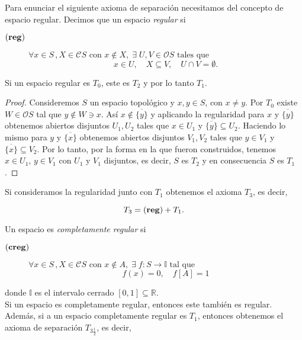 Para enunciar el siguiente axioma de separación necesitamos del concepto de espacio regular. Decimos que un espacio \emph{regular} si

\begin{description}
\item[$(\mbox{\textbf{reg}})$] $\forall x\in S\,, X\in \mathcal{C}S \mbox{ con }x\notin X,\; \exists\; U, V\in \mathcal{O}S \mbox{ tales que }$
\[
x\in U,\quad X\subseteq V, \quad U\cap V=\emptyset.
\]
\end{description}

\begin{prop}
    Si un espacio regular es $T_0$, este es $T_2$ y por lo tanto $T_1$.
\end{prop}

\begin{proof}
    Consideremos $S$ un espacio topológico y $x, y \in S$, con $x\neq y$. Por $T_0$ existe $W\in \mathcal{O}S$ tal que $y\notin W \ni x$. Así $x\notin \overline{\{y\}}$ y aplicando la regularidad para $x$ y $\overline{\{y\}}$ obtenemos abiertos disjuntos $U_1, U_2$ tales que $x\in U_1$ y $\overline{\{y\}}\subseteq U_2$. Haciendo lo mismo para $y$ y $\overline{\{x\}}$ obtenemos abiertos disjuntos $V_1, V_2$ tales que $y\in V_1$ y $\overline{\{x\}}\subseteq V_2$. Por lo tanto, por la forma en la que fueron construidos, tenemos $x\in U_1,\, y\in V_1$ con $U_1$ y $V_1$ disjuntos, es decir, $S$ es $T_2$ y en consecuencia $S$ es $T_1$.
\end{proof}

Si consideramos la regularidad junto con $T_1$ obtenemos el axioma $T_3$, es decir, 

\[
T_3=(\mbox{\textbf{reg}}) + T_1.
\]

Un espacio es \emph{completamente regular} si

\begin{description}
\item[$(\mbox{\textbf{creg}})$] $\forall x\in S\,, X\in \mathcal{C}S \mbox{ con }x\notin A,\; \exists\; f\colon S\to \mathbb{I}  \mbox{ tal que }$
\[
f(x)=0,\quad f[A]=1
\]
\end{description}
donde $\mathbb{I}$ es el intervalo cerrado $[0,1]\subseteq \mathbb{R}$.\\

Si un espacio es completamente regular, entonces este también es regular. Además, si a un espacio completamente regular es $T_1$, entonces obtenemos el axioma de separación $T_{3\frac{1}{2}}$, es decir,

